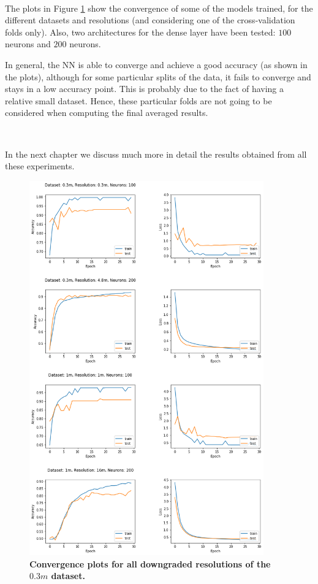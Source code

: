 \

The plots in Figure \ref{fig:conv_plots} show the convergence of some of the models trained, for the different datasets and resolutions (and considering one of the cross-validation folds only). Also, two architectures for the dense layer have been tested: $100$ neurons and $200$ neurons. 

In general, the NN is able to converge and achieve a good accuracy (as shown in the plots), although for some particular splits of the data, it fails to converge and stays in a low accuracy point. This is probably due to the fact of having a relative small dataset. Hence, these particular folds are not going to be considered when computing the final averaged results.

\

In the next chapter we discuss much more in detail the results obtained from all these experiments.

\begin{figure}[h!]
	\centering
	\includegraphics[width=0.9\textwidth]{Figures/results/convergence_plots_all_res.png}
	\captionsetup{width=1\linewidth}
	\caption{\textbf{Convergence plots for all downgraded resolutions of the $0.3m$ dataset.}}
	\label{fig:conv_plots}
\end{figure}


